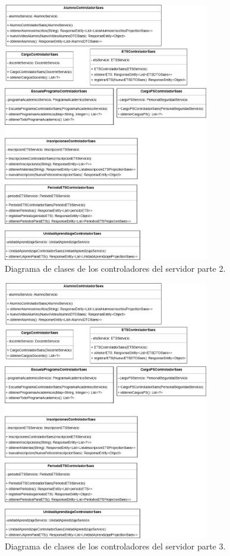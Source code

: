 \begin{figure}[htbp!]
	\begin{center}
		\includegraphics[width=0.8\textwidth]{Clases/Controlador1.png}
		\caption{Diagrama de clases de los controladores del servidor parte 2.}
		\label{fig:DC2}
	\end{center}
\end{figure}

\begin{figure}[htbp!]
	\begin{center}
		\includegraphics[width=0.8\textwidth]{Clases/Controlador1.png}
		\caption{Diagrama de clases de los controladores del servidor parte 3.}
		\label{fig:DC3}
	\end{center}
\end{figure}

